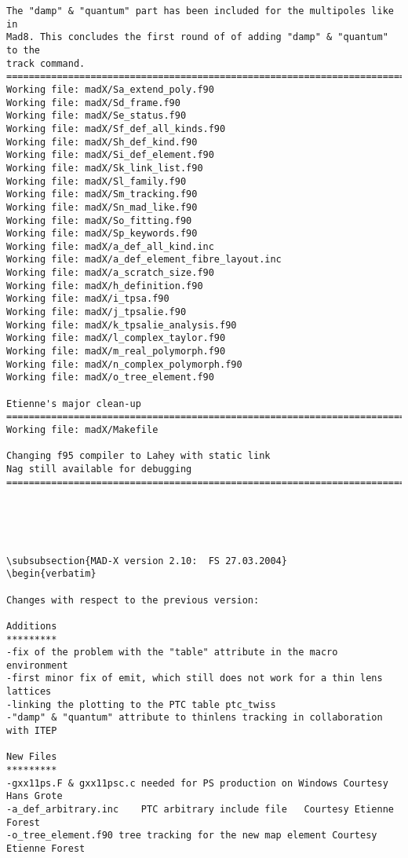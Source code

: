 \begin{verbatim}
The "damp" & "quantum" part has been included for the multipoles like in
Mad8. This concludes the first round of of adding "damp" & "quantum" to the
track command.
=============================================================================
Working file: madX/Sa_extend_poly.f90
Working file: madX/Sd_frame.f90
Working file: madX/Se_status.f90
Working file: madX/Sf_def_all_kinds.f90
Working file: madX/Sh_def_kind.f90
Working file: madX/Si_def_element.f90
Working file: madX/Sk_link_list.f90
Working file: madX/Sl_family.f90
Working file: madX/Sm_tracking.f90
Working file: madX/Sn_mad_like.f90
Working file: madX/So_fitting.f90
Working file: madX/Sp_keywords.f90
Working file: madX/a_def_all_kind.inc
Working file: madX/a_def_element_fibre_layout.inc
Working file: madX/a_scratch_size.f90
Working file: madX/h_definition.f90
Working file: madX/i_tpsa.f90
Working file: madX/j_tpsalie.f90
Working file: madX/k_tpsalie_analysis.f90
Working file: madX/l_complex_taylor.f90
Working file: madX/m_real_polymorph.f90
Working file: madX/n_complex_polymorph.f90
Working file: madX/o_tree_element.f90

Etienne's major clean-up
=============================================================================
Working file: madX/Makefile

Changing f95 compiler to Lahey with static link
Nag still available for debugging
=============================================================================





\subsubsection{MAD-X version 2.10:  FS 27.03.2004}
\begin{verbatim}

Changes with respect to the previous version:

Additions
*********
-fix of the problem with the "table" attribute in the macro environment
-first minor fix of emit, which still does not work for a thin lens lattices
-linking the plotting to the PTC table ptc_twiss
-"damp" & "quantum" attribute to thinlens tracking in collaboration with ITEP

New Files
*********
-gxx11ps.F & gxx11psc.c needed for PS production on Windows Courtesy Hans Grote
-a_def_arbitrary.inc    PTC arbitrary include file   Courtesy Etienne Forest
-o_tree_element.f90 tree tracking for the new map element Courtesy Etienne Forest


\end{verbatim}
